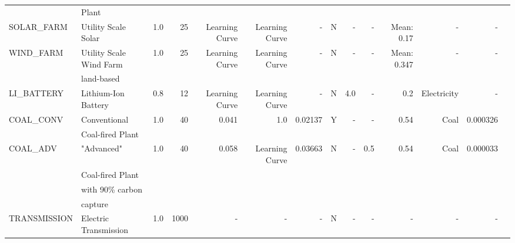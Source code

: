 \begin{tabular}{llrrrrrrrrrrrr}
     &Plant&&&&&&&&&&&&\\
  SOLAR\_FARM &                                Utility Scale Solar &         1.0 &        25 &                      Learning Curve &                      Learning Curve &                    - &               N &                      - &       - &          Mean: 0.17 &          - &                     - &       \cite{nrel_2020_2020} \\
   WIND\_FARM &                Utility Scale Wind Farm &         1.0 &        25 &                      Learning Curve &                      Learning Curve &                    - &               N &                      - &       - &         Mean: 0.347 &          - &                     - &     \cite{nrel_2020_2020}   \\
   &land-based&&&&&&&&&&&&\\
  LI\_BATTERY &                                Lithium-Ion Battery &         0.8 &        12 &                      Learning Curve &                      Learning Curve &                    - &               N &                      4.0 &       - &                 0.2 &  Electricity &                     - &     \cite{nrel_2020_2020}   \\
   COAL\_CONV &                      Conventional  &         1.0 &        40 &                  0.041 &                     1.0 &                0.02137 &               Y &                      - &       - &                0.54 &         Coal &                     0.000326 &    \cite{sargent__lundy_capital_2020}    \\
   &Coal-fired Plant&&&&&&&&&&&&\\
    COAL\_ADV & "Advanced"   &         1.0 &        40 &                      0.058 &                      Learning Curve &                0.03663 &               N &                      - &       0.5 &                0.54 &         Coal &                     0.000033 &    \cite{nrel_2020_2020}    \\
    &Coal-fired Plant&&&&&&&&&&&&\\
    &with 90\% carbon&&&&&&&&&&&&\\
    & capture&&&&&&&&&&&&\\
TRANSMISSION &                        Electric Transmission &         1.0 &      1000 &                     - &                     - &                    - &               N &                      - &       - &                 - &          - &                     - &        \\
\bottomrule
\end{tabular}

